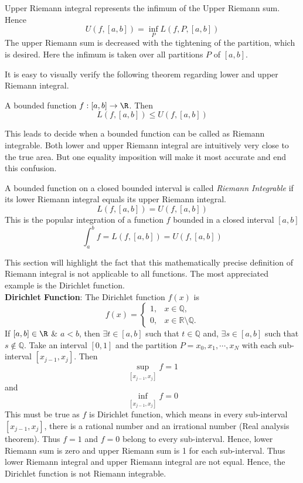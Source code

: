 \begin{definition}
Upper Riemann integral represents the infimum of the Upper Riemann sum. Hence
\[
U(f, [a, b]) = \inf_P L(f, P, [a, b])
\]
The upper Riemann sum is decreased with the tightening of the partition, which is desired. Here the infimum is taken over all partitions $P$ of $[a, b]$. 
    
\end{definition}
It is easy to visually verify the following theorem regarding lower and upper Riemann integral.
\begin{theorem}
    A bounded function $f:[a, b]\to \R$. Then
    \[
    L(f, [a, b])\leq U(f, [a, b])
    \]
\end{theorem}
This leads to decide when a bounded function can be called as Riemann integrable. Both lower and upper Riemann integral are intuitively very close to the true area. But one equality imposition will make it most accurate and end this confusion.
\begin{definition}
    A bounded function on a closed bounded interval is called \textit{Riemann Integrable} if its lower Riemann integral equals its upper Riemann integral. 
    \[
    L(f, [a, b]) = U(f, [a, b])
    \]
    This is the popular integration of a function $f$ bounded in a closed interval $[a, b]$
    \[
    \int_a^b f = L(f, [a, b]) = U(f, [a, b])
    \]
\end{definition}
\begin{concept}
    This section will highlight the fact that this mathematically precise definition of Riemann integral is not applicable to all functions. The most appreciated example is the Dirichlet function.\\
    \textbf{Dirichlet Function}: The Dirichlet function $f(x)$ is
    \[
    f(x)=
\begin{cases}
1, & x \in \mathbb{Q}, \\
0, & x \in \mathbb{R}\setminus\mathbb{Q}.
\end{cases}
    \]
  If $[a, b]\in\R$ \& $a<b$, then $\exists t\in [a, b]$ such that $t\in \mathbb{Q}$ and, $\exists s\in [a, b]$ such that $s\notin \mathbb{Q}$. Take an interval $[0, 1]$ and the partition $P={x_0, x_1,\cdots ,x_N}$ with each sub-interval $[x_{j-1}, x_j]$. Then
  \[
  \sup_{[x_{j-1}, x_j]} f =1
  \]
  and 
  \[
  \inf_{[x_{j-1}, x_j]} f = 0
  \]
  This must be true as $f$ is Dirichlet function, which means in every sub-interval $[x_{j-1}, x_j]$, there is a rational number and an irrational number (Real analysis theorem). Thus $f=1$ and $f=0$ belong to every sub-interval. Hence, lower Riemann sum is zero and upper Riemann sum is 1 for each sub-interval. Thus lower Riemann integral and upper Riemann integral are not equal. Hence, the Dirichlet function is not Riemann integrable.
\end{concept}
